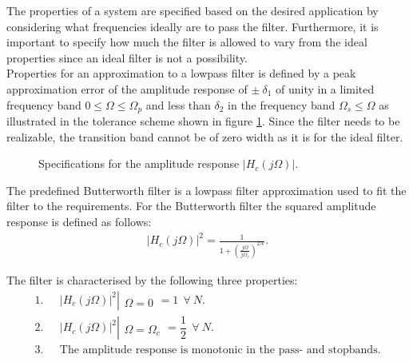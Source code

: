 The properties of a system are specified based on the desired application by considering what frequencies ideally are to pass the filter. Furthermore, it is important to specify how much the filter is allowed to vary from the ideal properties since an ideal filter is not a possibility. \\
Properties for an approximation to a lowpass filter is defined by a peak approximation error of the amplitude response of $\pm \ \delta_1$ of unity in a limited frequency band $0 \leq \Omega \leq \Omega_p $ and less than $\delta_2$ in the frequency band $\Omega_s \leq \Omega$ as illustrated in the tolerance scheme shown in figure \ref{fig:scheme}. Since the filter needs to be realizable, the transition band cannot be of zero width as it is for the ideal filter.
\begin{figure}[H]
\centering
{}
\caption{Specifications for the amplitude response $|H_c(j\Omega)|$.}
\label{fig:scheme}
\end{figure}

The predefined Butterworth filter is a lowpass filter approximation used to fit the filter to the requirements. For the Butterworth filter the squared amplitude response is defined as follows:
\begin{align} \label{eq:butter}
|H_c(j\Omega)|^2=\frac{1}{1+\left( \frac{j\Omega}{j\Omega_c}\right)^{2N}}.
\end{align}

The filter is characterised by the following three properties:
\begin{align*}
1.& \ \ \ |H_c(j\Omega)|^2 \left|\begin{matrix}
\\
\Omega=0
\end{matrix}\right. = 1 \ \  \forall \ N. \\
2.& \ \ \ |H_c(j\Omega)|^2 \left|\begin{matrix}
\\ 
\Omega=\Omega_c
\end{matrix}\right. = \dfrac{1}{2} \ \ \forall \ N. \\
3.& \ \ \ \text{The amplitude response is monotonic in the pass- and stopbands.}
\end{align*}

